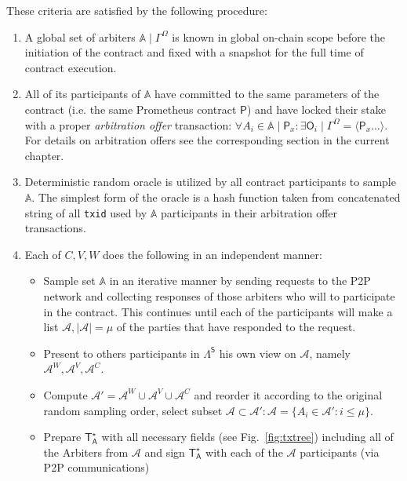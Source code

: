 \documentclass[a4paper]{article}
\begin{document}
These criteria are satisfied by the following procedure:
\begin{enumerate}
    \item A global set of arbiters $\mathbb{A} \mid \Gamma^\Omega$ is known in global on-chain scope before the initiation of the contract and fixed with a snapshot for the full time of contract execution.
    
    \item All of its participants of $\mathbb{A}$ have committed to the same parameters of the contract (i.e. the same Prometheus contract $\mathsf{P}$) and have locked their stake with a proper \textit{arbitration offer} transaction: $\forall A_i \in \mathbb{A} \mid \mathsf{P}_x: \exists \mathsf{O}_i \mid \Gamma^\Omega = \langle \mathsf{P}_x \dots \rangle$. For details on arbitration offers see the corresponding section in the current chapter.
    
    \item Deterministic random oracle is utilized by all contract participants to sample $\mathbb{A}$. The simplest form of the oracle is a hash function taken from concatenated string of all \texttt{txid} used by $\mathbb{A}$ participants in their arbitration offer transactions.
    
    \item Each of $C, V, W$ does the following in an independent manner:
    \begin{itemize}
        \item Sample set $\mathbb{A}$ in an iterative manner by sending requests to the P2P network and collecting responses of those arbiters who will to participate in the contract. This continues until each of the participants will make a list $\mathcal{A}, |\mathcal{A}|=\mu$ of the parties that have responded to the request.
        
        \item Present to others participants in $\Lambda^\mathsf{S}$ his own view on $\mathcal{A}$, namely $\mathcal{A}^W, \mathcal{A}^V, \mathcal{A}^C$.
        
        \item Compute $\mathcal{A}' = \mathcal{A}^W \cup \mathcal{A}^V \cup \mathcal{A}^C$ and reorder it according to the original random sampling order, select subset $\mathcal{A} \subset \mathcal{A}': \mathcal{A} = \{ A_i \in \mathcal{A}': i \le \mu \}$.
        
        \item Prepare $\mathsf{T^\star_A}$ with all necessary fields (see Fig.~\ref{fig:txtree}) including all of the Arbiters from $\mathcal{A}$ and sign $\mathsf{T^\star_A}$ with each of the $\mathcal{A}$ participants (via P2P communications)
        

\end{itemize}
\end{enumerate}
\end{document}
